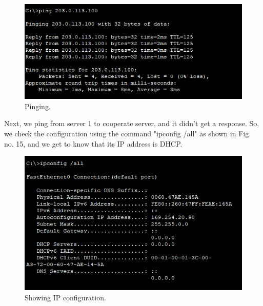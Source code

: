 \documentclass[12pt,a4paper]{article}
\begin{document}
\begin{figure}[h]
 		\centering
				\includegraphics[scale=0.75]{5.5.png}	


			\caption{Pinging.}
			\label{fig:AP}
	\end{figure}

Next, we ping from server 1 to cooperate server, and it didn't get a response. So, we check the configuration using the command "ipconfig /all" as shown in Fig. no. 15, and we get to know that its IP address is DHCP.
\begin{figure}[h]
 		\centering
				\includegraphics[scale=0.70]{5.6.png}	


			\caption{Showing IP configuration.}
			\label{fig:AP}
	\end{figure}
\end{document}
